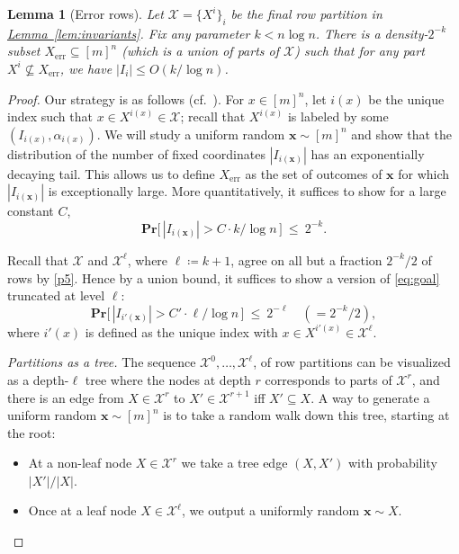 \documentclass[11pt]{article}
\numberwithin{equation}{section}
\newtheorem{lemma}[theorem]{Lemma}
\theoremstyle{definition}
\theoremstyle{plain}
\newcommand{\expref}[2]{\hyperref[#2]{#1~\ref{#2}}}
\renewcommand{\Pr}{\mathbf{Pr}}
\DeclareMathOperator{\err}{err}
\newcommand{\x}{\bm{x}}
\newcommand{\calX}{\mathcal{X}}
\begin{document}
\begin{lemma}[Error rows] \label{lem:tri-row-error-bound}
Let $\calX =\{X^i\}_i$ be the final row partition in \expref{Lemma}{lem:invariants}. Fix any parameter $k<n\log n$. There is a density-$2^{-k}$ subset $X_{\err} \subseteq [m]^n$ (which is a union of parts of $\calX$) such that for any part $X^i\not\subseteq X_{\err}$, we have $|I_i|\leq O(k/\log n)$.
\end{lemma}
\begin{proof}
Our strategy is as follows (cf.~\cite[Lemma 7]{goos17bpp}). For $x\in[m]^n$, let $i(x)$ be the unique index such that $x\in X^{i(x)}\in\calX$; recall that $X^{i(x)}$ is labeled by some $(I_{i(x)},\alpha_{i(x)})$. We will study a uniform random $\x\sim[m]^n$ and show that the distribution of the number of fixed coordinates $|I_{i(\x)}|$ has an exponentially decaying tail. This allows us to define $X_{\err}$ as the set of outcomes of $\x$ for which $|I_{i(\x)}|$ is exceptionally large. More quantitatively, it suffices to show for a large constant $C$,
\begin{equation}\label{eq:goal}
\Pr\big[\, |I_{i(\x)}| > C\cdot k/\log n\,\big]~\leq~2^{-k}.
\end{equation}

Recall that $\calX$ and $\calX^{\ell}$, where $\ell\coloneqq k+1$, agree on all but a fraction $2^{-k}/2$ of rows by \ref{p5}. Hence by a union bound, it suffices to show a version of \eqref{eq:goal} truncated at level $\ell$:
\begin{equation}\label{eq:goal2}
\Pr\big[\, |I_{i'(\x)}| > C'\cdot \ell/\log n\,\big]~\leq~2^{-\ell}\quad(= 2^{-k}/2),
\end{equation}
where $i'(x)$ is defined as the unique index with $x\in X^{i'(x)}\in \calX^{\ell}$.


\emph{Partitions as a tree.}
The sequence $\calX^0,\ldots,\calX^\ell$, of row partitions can be visualized as a depth-$\ell$ tree where the nodes at depth $r$ corresponds to parts of $\calX^r$, and there is an edge from $X\in\calX^r$ to $X'\in\calX^{r+1}$ iff $X'\subseteq X$. A way to generate a uniform random $\x\sim[m]^n$ is to take a random walk down this tree, starting at the root:
\begin{itemize}
\item At a non-leaf node $X\in\calX^r$ we take a tree edge $(X,X')$ with probability $|X'|/|X|$.
\item Once at a leaf node $X\in\calX^\ell$, we output a uniformly %
random $\x\sim X$.
\end{itemize}


\end{proof}
\end{document}
